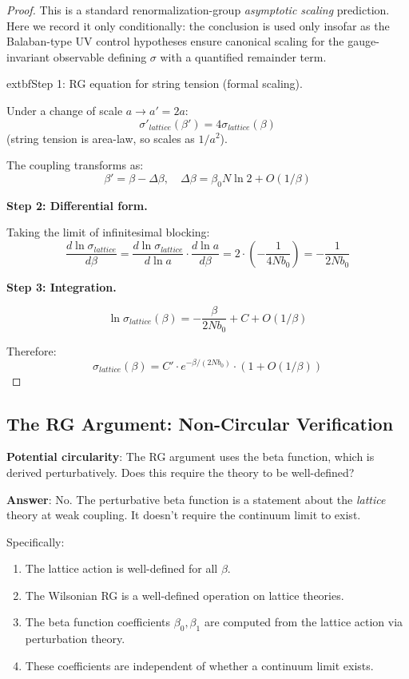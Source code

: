 \begin{proof}
This is a standard renormalization-group \emph{asymptotic scaling} prediction. Here we record it only conditionally: the conclusion is used only insofar as the Balaban-type UV control hypotheses ensure canonical scaling for the gauge-invariant observable defining $\sigma$ with a quantified remainder term.

            extbf{Step 1: RG equation for string tension (formal scaling).}

Under a change of scale $a \to a' = 2a$:
\[
\sigma'_{lattice}(\beta') = 4\sigma_{lattice}(\beta)
\]
(string tension is area-law, so scales as $1/a^2$).

The coupling transforms as:
\[
\beta' = \beta - \Delta\beta, \quad \Delta\beta = \beta_0 N \ln 2 + O(1/\beta)
\]

\textbf{Step 2: Differential form.}

Taking the limit of infinitesimal blocking:
\[
\frac{d\ln\sigma_{lattice}}{d\beta} = \frac{d\ln\sigma_{lattice}}{d\ln a} \cdot \frac{d\ln a}{d\beta} = 2 \cdot \left(-\frac{1}{4Nb_0}\right) = -\frac{1}{2Nb_0}
\]

\textbf{Step 3: Integration.}

\[
\ln\sigma_{lattice}(\beta) = -\frac{\beta}{2Nb_0} + C + O(1/\beta)
\]

Therefore:
\[
\sigma_{lattice}(\beta) = C' \cdot e^{-\beta/(2Nb_0)} \cdot (1 + O(1/\beta))
\]
\end{proof}

\subsection{The RG Argument: Non-Circular Verification}

\textbf{Potential circularity}: The RG argument uses the beta function, which 
is derived perturbatively. Does this require the theory to be well-defined?

\textbf{Answer}: No. The perturbative beta function is a statement about the 
\textit{lattice} theory at weak coupling. It doesn't require the continuum limit 
to exist.

Specifically:
\begin{enumerate}
\item The lattice action is well-defined for all $\beta$.
\item The Wilsonian RG is a well-defined operation on lattice theories.
\item The beta function coefficients $\beta_0, \beta_1$ are computed from the 
      lattice action via perturbation theory.
\item These coefficients are independent of whether a continuum limit exists.
\end{enumerate}

